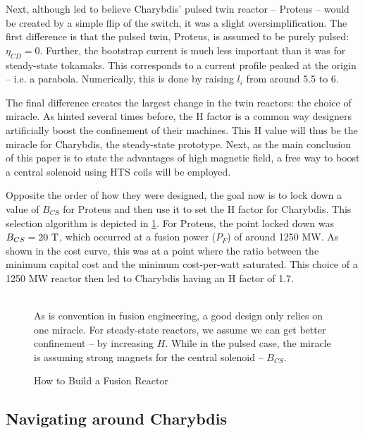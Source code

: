 Next, although led to believe Charybdis' pulsed twin reactor -- Proteus -- would be created by a simple flip of the switch, it was a slight oversimplification. The first difference is that the pulsed twin, Proteus, is assumed to be purely pulsed: $\eta_{CD} = 0$. Further, the bootstrap current is much less important than it was for steady-state tokamaks. This corresponds to a current profile peaked at the origin -- i.e. a parabola. Numerically, this is done by raising $l_i$ from around 5.5 to 6.

The final difference creates the largest change in the twin reactors: the choice of miracle. As hinted several times before, the H factor is a common way designers artificially boost the confinement of their machines. This H value will thus be the miracle for Charybdis, the steady-state prototype. Next, as the main conclusion of this paper is to state the advantages of high magnetic field, a free way to boost a central solenoid using HTS coils will be employed.

Opposite the order of how they were designed, the goal now is to lock down a value of $B_{CS}$ for Proteus and then use it to set the H factor for Charybdis. This selection algorithm is depicted in \cref{fig:selection}. For Proteus, the point locked down was $B_{CS} = 20 \ \textnormal{T}$, which occurred at a fusion power ($P_F$) of around 1250 MW. As shown in the cost curve, this was at a point where the ratio between the minimum capital cost and the minimum cost-per-watt saturated. This choice of a 1250 MW reactor then led to Charybdis having an H factor of 1.7.

\begin{figure}[h!]
\centering

\caption{How to Build a Fusion Reactor} ~ \\
\small As is convention in fusion engineering, a good design only relies on one miracle. For steady-state reactors, we assume we can get better confinement -- by increasing $H$. While in the pulsed case, the miracle is assuming strong magnets for the central solenoid -- $B_{CS}$.
\label{fig:selection}
\end{figure}

\clearpage

\newpage

\subsection{Navigating around Charybdis}

